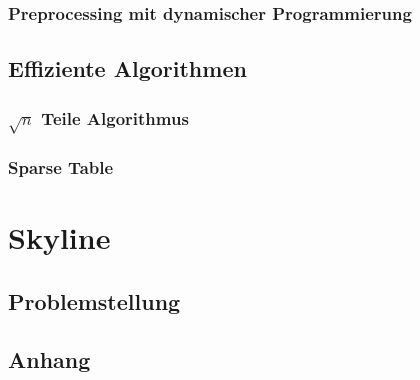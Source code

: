 \subsection{Preprocessing mit dynamischer Programmierung}

\section{Effiziente Algorithmen}
\subsection{$\sqrt n $ Teile Algorithmus}

\subsection{Sparse Table}

\chapter{Skyline}

\section{Problemstellung}

\section{Anhang}
